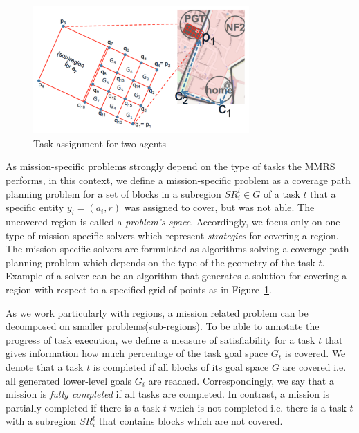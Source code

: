 \documentclass[journal]{IEEEtran}
\theoremstyle{definition}
\newcommand\darko[1]{\nb{Darko}{#1}}
\begin{document}
\begin{figure}[h]
\includegraphics[width=3.25in]{Figures/Synthesis2.png}
\caption{Task assignment for two agents}\label{Fig:Synthesis}
\end{figure}



 As mission-specific problems strongly depend on the type of tasks the MMRS performs, in this context, we define a mission-specific problem as a coverage path planning problem for a set of blocks in a subregion $SR^t_i \in G$ of a task $t$ that a specific entity $y_i=(a_i,r)$  was assigned to cover, but was not able. The uncovered region is called a \textit{problem's space}.
Accordingly, we focus only on one type of mission-specific solvers which represent \textit{strategies} for covering a region. The mission-specific solvers are formulated as algorithms solving a coverage path planning problem which depends on the type of the geometry of the task $t$. Example of a solver can be an algorithm that generates a solution for covering a region with respect to a specified grid of points as in Figure~\ref{Fig:Synthesis}.


As we work particularly with regions, a mission related problem can be decomposed on smaller problems(sub-regions). 
To be able to annotate the progress of task execution, we define a measure of satisfiability for a task $t$ that gives information how much percentage of the task goal space $G_t$ is covered. %
We denote that a task $t$ is completed if all blocks of its goal space $G$ are covered i.e. all generated lower-level goals $G_i$ are reached. Correspondingly, we  say  that  a  mission is \textit{fully completed} if all tasks are completed. 
In contrast, a mission is partially completed if there is a task $t$ which is not completed i.e. there is a task $t$ with a subregion $SR^t_i$ that contains blocks which are not covered.
\end{document}
